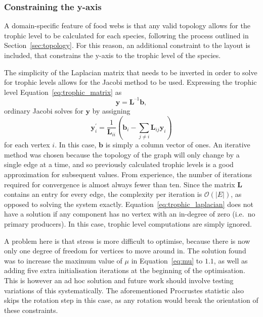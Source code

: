 \subsubsection{Constraining the y-axis}
A domain-specific feature of food webs is that any valid topology allows for the trophic level to be calculated for each species, following the process outlined in Section~\ref{sec:topology}. For this reason, an additional constraint to the layout is included, that constrains the y-axis to the trophic level of the species.

The simplicity of the Laplacian matrix that needs to be inverted in order to solve for trophic levels allows for the Jacobi method to be used. Expressing the trophic level Equation~\eqref{eq:trophic_matrix} as 
\begin{equation}
  \mathbf{y} = \mathbf{L}^{\text{--}1}\mathbf{b},
  \label{eq:trophic_laplacian}
\end{equation}
ordinary Jacobi solves for $\mathbf{y}$ by assigning
\begin{equation}
  \mathbf{y}_i^\prime = \frac{1}{\mathbf{L}_{ii}}\left(\mathbf{b}_i - \sum_{j\neq i}\mathbf{L}_{ij}\mathbf{y}_i\right)
\end{equation}
for each vertex $i$. In this case, $\mathbf{b}$ is simply a column vector of ones.
An iterative method was chosen because the topology of the graph will only change by a single edge at a time, and so previously calculated trophic levels is a good approximation for subsequent values. From experience, the number of iterations required for convergence is almost always fewer than ten. Since the matrix $\mathbf{L}$ contains an entry for every edge, the complexity per iteration is $\mathcal{O}(|E|)$, as opposed to solving the system exactly. 
Equation~\eqref{eq:trophic_laplacian} does not have a solution if any component has no vertex with an in-degree of zero (i.e.\ no primary producers). In this case, trophic level computations are simply ignored.

A problem here is that stress is more difficult to optimise, because there is now only one degree of freedom for vertices to move around in. The solution found was to increase the maximum value of $\mu$ in Equation~\eqref{eq:mu} to $1.1$, as well as adding five extra initialisation iterations at the beginning of the optimisation. This is however an ad hoc solution and future work should involve testing variations of this systematically.
The aforementioned Procrustes statistic also skips the rotation step in this case, as any rotation would break the orientation of these constraints.


